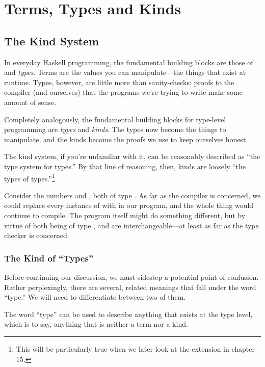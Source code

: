 \documentclass[book.tex]{subfiles}
\begin{document}
\chapter{Terms, Types and Kinds}

\section{The Kind System}

In everyday Haskell programming, the fundamental building blocks are those of
 and \emph{types}. Terms are the values you can
manipulate---the things that exist at runtime. Types, however, are little more
than sanity-checks: proofs to the compiler (and ourselves) that the programs
we're trying to write make some amount of sense.

Completely analogously, the fundamental building blocks for type-level
programming are \emph{types} and \emph{kinds}. The types now become the things
to manipulate, and the kinds become the proofs we use to keep ourselves honest.

The kind system, if you're unfamiliar with it, can be reasonably described as
``the type system for types.'' By that line of reasoning, then, kinds are
loosely ``the types of types.''\footnote{This will be particularly true when we
later look at the  extension in chapter 15.}


Consider the numbers  and , both of type . As far as the
compiler is concerned, we could replace every instance of  with  in
our program, and the whole thing would continue to compile. The program itself
might do something different, but by virtue of both being of type ,
 and  are interchangeable---at least as far as the type checker is
concerned.


\subsection{The Kind of ``Types''}

Before continuing our discussion, we must sidestep a potential point of
confusion. Rather perplexingly, there are several, related meanings that fall
under the word ``type.'' We will need to differentiate between two of them.

The word ``type'' can be used to describe anything that exists at the type
level, which is to say, anything that is neither a term nor a kind.
\end{document}
